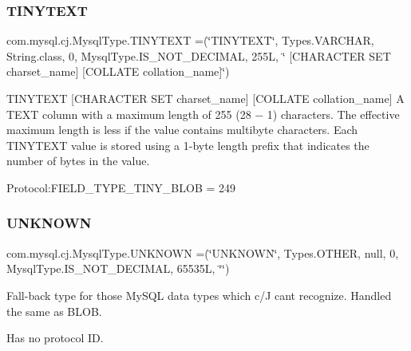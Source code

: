 \subsubsection{\texorpdfstring{T\+I\+N\+Y\+T\+E\+XT}{TINYTEXT}}
{\footnotesize\ttfamily com.\+mysql.\+cj.\+Mysql\+Type.\+T\+I\+N\+Y\+T\+E\+XT =(\char`\"{}T\+I\+N\+Y\+T\+E\+XT\char`\"{}, Types.\+V\+A\+R\+C\+H\+AR, String.\+class, 0, Mysql\+Type.\+I\+S\+\_\+\+N\+O\+T\+\_\+\+D\+E\+C\+I\+M\+AL, 255\+L, \char`\"{} \mbox{[}\+C\+H\+A\+R\+A\+C\+T\+E\+R S\+E\+T charset\+\_\+name\mbox{]} \mbox{[}\+C\+O\+L\+L\+A\+T\+E collation\+\_\+name\mbox{]}\char`\"{})}

T\+I\+N\+Y\+T\+E\+XT \mbox{[}C\+H\+A\+R\+A\+C\+T\+ER S\+ET charset\+\_\+name\mbox{]} \mbox{[}C\+O\+L\+L\+A\+TE collation\+\_\+name\mbox{]} A T\+E\+XT column with a maximum length of 255 (28 − 1) characters. The effective maximum length is less if the value contains multibyte characters. Each T\+I\+N\+Y\+T\+E\+XT value is stored using a 1-\/byte length prefix that indicates the number of bytes in the value.

Protocol\+:F\+I\+E\+L\+D\+\_\+\+T\+Y\+P\+E\+\_\+\+T\+I\+N\+Y\+\_\+\+B\+L\+OB = 249 \mbox{\label{enumcom_1_1mysql_1_1cj_1_1_mysql_type_a5c1f5a756ee4ef0468c1782e0f2bec65}} 
\subsubsection{\texorpdfstring{U\+N\+K\+N\+O\+WN}{UNKNOWN}}
{\footnotesize\ttfamily com.\+mysql.\+cj.\+Mysql\+Type.\+U\+N\+K\+N\+O\+WN =(\char`\"{}U\+N\+K\+N\+O\+WN\char`\"{}, Types.\+O\+T\+H\+ER, null, 0, Mysql\+Type.\+I\+S\+\_\+\+N\+O\+T\+\_\+\+D\+E\+C\+I\+M\+AL, 65535\+L, \char`\"{}\char`\"{})}

Fall-\/back type for those My\+S\+QL data types which c/J can\textquotesingle{}t recognize. Handled the same as B\+L\+OB.

Has no protocol ID. \mbox{\label{enumcom_1_1mysql_1_1cj_1_1_mysql_type_a8178476164112332f2b676c85c208baa}} 
